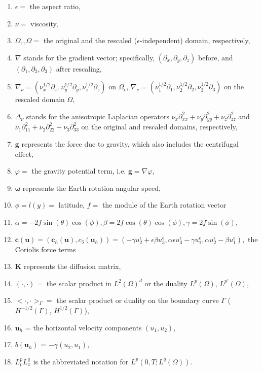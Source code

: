 \documentclass[11pt]{article}
\begin{document}
\begin{enumerate}

\item $\epsilon = $ the aspect ratio,
\item $\nu = $ viscosity,
\item $\Omega_\epsilon, \Omega = $ the original and the rescaled ($\epsilon$-independent) domain, respectively,
\item $\nabla$ stands for the gradient vector; specifically, $(\partial_x, \partial_y, \partial_z)$ before, and $(\partial_1, \partial_2, \partial_3)$ after rescaling,
\item $\nabla_\nu = (\nu_x^{1/2} \partial_x, \nu_y^{1/2} \partial_y, \nu_z^{1/2} \partial_z)$ on $\Omega_\epsilon$, $\nabla_\nu = (\nu_1^{1/2} \partial_1, \nu_2^{1/2} \partial_2, \nu_3^{1/2} \partial_3)$ on the rescaled domain $\Omega,$
\item $ \Delta_\nu$ stands for the anisotropic Laplacian operators $\nu_x \partial^2_{xx} + \nu_y \partial^2_{yy}  + \nu_z \partial^2_{zz}$ and $\nu_1 \partial^2_{11} + \nu_2 \partial^2_{22}  + \nu_3 \partial^2_{33}$ on the original and rescaled domains, respectively,
\item $\mathbf{g}$ represents the force due to gravity, which also includes the centrifugal effect,
\item $\varphi = $ the gravity potential term, i.e. $\mathbf{g} = \nabla \varphi,$
\item $\mathbf{\omega}$ represents the Earth rotation angular speed,
\item $\phi = l(y) = $ latitude, $f = $ the module of the Earth rotation vector
\item $\alpha = -2 f \sin(\theta)\cos(\phi), \beta = 2 f \cos(\theta) \cos(\phi), \gamma = 2 f \sin(\phi),$
\item $\mathbf{c}(\mathbf{u}) = (\mathbf{c}_h (\mathbf{u}), c_3 (\mathbf{u}_h)) = ( -\gamma u_2^\epsilon + \epsilon \beta u_3^\epsilon, \alpha \epsilon u^\epsilon_3 - \gamma u_1^\epsilon, \alpha u^\epsilon_2 - \beta u_1^\epsilon),$ the Coriolis force terms 
\item $\mathbf{K}$ represents the diffusion matrix,
\item $( \cdot,\cdot) = $ the scalar product in $L^2(\Omega)^d$ or the duality $L^p (\Omega)$, $L^{p'} (\Omega),$
\item $< \cdot,\cdot>_{\Gamma} = $ the scalar product or duality on the boundary curve $\Gamma$ ($H^{-1/2}(\Gamma)$, $H^{1/2}(\Gamma)$),
\item $\mathbf{u}_h$ = the horizontal velocity components $(u_1, u_2),$
\item $b(\mathbf{u}_h)$ = $- \gamma (u_2 , u_1),$
\item $L^p_t L^q_x$ is the abbreviated notation for $L^p (0, T; L^q(\Omega)).$

\end{enumerate}
\end{document}
